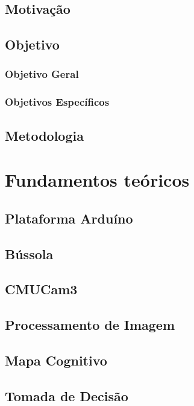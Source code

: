 \documentclass[oneside]{normas-utf-tex} %
\begin{document}
\section{Motivação}

\section{Objetivo}

\subsection{Objetivo Geral}

\subsection{Objetivos Específicos}

\section{Metodologia}

\chapter{Fundamentos teóricos}

\section{Plataforma Arduíno}

\section{Bússola}

\section{CMUCam3}

\section{Processamento de Imagem}

\section{Mapa Cognitivo}

\section{Tomada de Decisão}
\end{document}
